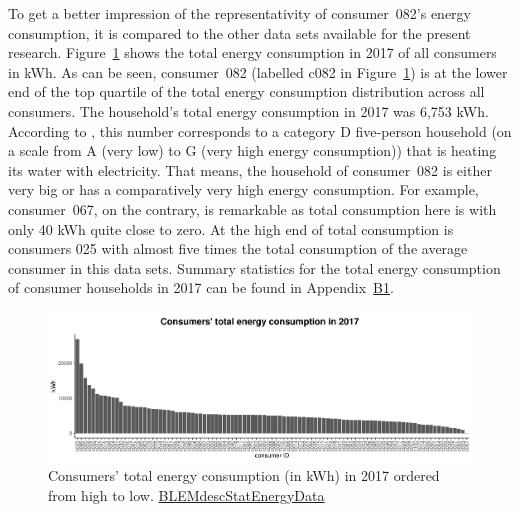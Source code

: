 To get a better impression of the representativity of consumer~082's energy consumption, it is compared to the other data sets available for the present research. Figure~\ref{Fig:cons_total_consumption} shows the total energy consumption in  2017 of all consumers in kWh. As can be seen, consumer~082 (labelled c082 in Figure~\ref{Fig:cons_total_consumption}) is at the lower end of the top quartile of the total energy consumption distribution across all consumers. The household's total energy consumption in 2017 was 6,753 kWh. According to \citet{Stromspiegel:2017}, this number corresponds to a category D five-person household (on a scale from A (very low) to G (very high energy consumption)) that is heating its water with electricity. That means, the household of consumer~082 is either very big or has a comparatively very high energy consumption. For example, consumer~067, on the contrary, is remarkable as total consumption here is with only 40 kWh quite close to zero. At the high end of total consumption is consumers 025 with almost five times the total consumption of the average consumer in this data sets. Summary statistics for the total energy consumption of consumer households in 2017 can be found in Appendix~\hyperlink{AppB1:Tables:totalcons}{B1}.
%
\begin{figure}[htbp]
 \centering
\includegraphics[width=\textwidth]{thesis/graphs/consumer_totalconsumption.pdf}
\caption[Consumers' total energy consumption in 2017]{Consumers' total energy consumption (in kWh) in 2017 ordered from high to low. \quantnet\href{https://github.com/QuantLet/BLEM/tree/master/BLEMdescStatEnergyData}{BLEMdescStatEnergyData}}
\label{Fig:cons_total_consumption}
\end{figure}
%

